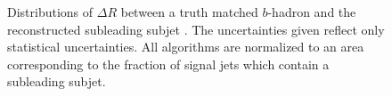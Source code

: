 \begin{figure}[!htbp]
  \centering
   \hfill

  \caption{Distributions of $\Delta R$ between a truth matched $b$-hadron and
the reconstructed subleading subjet \cite{ATL-PHYS-PUB-2017-010}.  The
uncertainties given reflect only statistical uncertainties.  All algorithms are
normalized to an area corresponding to the fraction of signal jets which
contain a subleading subjet.} 
  \label{sec:objects:subleading_vr}
\end{figure}




